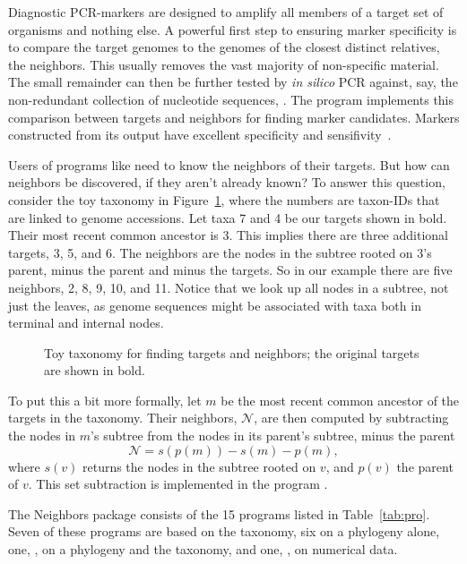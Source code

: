 Diagnostic PCR-markers are designed to amplify all members of a target
set of organisms and nothing else. A powerful first step to ensuring
marker specificity is to compare the target genomes to the genomes of
the closest distinct relatives, the neighbors. This usually removes
the vast majority of non-specific material. The small remainder can
then be further tested by \emph{in silico} PCR against, say, the
non-redundant collection of nucleotide sequences, . The
program  implements this comparison between targets and
neighbors for finding marker candidates. Markers constructed from its
output have excellent specificity and sensifivity~\cite{hau21:fur}.

Users of programs like  need to know the neighbors of their
targets. But how can neighbors be discovered, if they aren't already
known? To answer this question, consider the toy taxonomy in
Figure~\ref{fig:tax}, where the numbers are taxon-IDs that are linked
to genome accessions. Let taxa 7 and 4 be our targets shown in
bold. Their most recent common ancestor is 3. This implies there are
three additional targets, 3, 5, and 6. The neighbors are the nodes in
the subtree rooted on 3's parent, minus the parent and minus the
targets. So in our example there are five neighbors, 2, 8, 9, 10, and
11. Notice that we look up all nodes in a subtree, not just the
leaves, as genome sequences might be associated with taxa both in
terminal and internal nodes.

\begin{figure}
\begin{center}

\end{center}
\caption{Toy taxonomy for finding targets and neighbors; the original
targets are shown in bold.}\label{fig:tax}
\end{figure}

To put this a bit more formally, let $m$ be the most recent common
ancestor of the targets in the taxonomy. Their neighbors,
$\mathcal{N}$, are then computed by subtracting the nodes in $m$'s
subtree from the nodes in its parent's subtree, minus the parent
\begin{equation}\label{eq:nei}
\mathcal{N} = s(p(m)) - s(m) - p(m),
\end{equation}
where $s(v)$ returns the nodes in the subtree rooted on $v$, and
$p(v)$ the parent of $v$. This set subtraction is implemented in the
program .

The Neighbors package consists of the 15 programs listed in
Table~\ref{tab:pro}. Seven of these programs are based on the
taxonomy, six on a phylogeny alone, one, , on a phylogeny
and the taxonomy, and one, , on numerical data.

